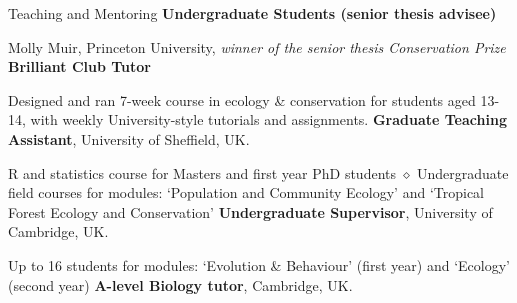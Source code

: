 \begin{rubric}{Teaching and Mentoring}
\entry*[2019 -- 2020] \textbf{Undergraduate Students (senior thesis advisee)}
\par Molly Muir, Princeton University, \emph{winner of the senior thesis Conservation Prize}
\entry*[2017 -- 2018] \textbf{Brilliant Club Tutor}
\par Designed and ran 7-week course in ecology \& conservation for students aged 13-14, with weekly University-style tutorials and assignments.
\entry*[2014 -- 2018] \textbf{Graduate Teaching Assistant}, University of Sheffield, UK.
\par R and statistics course for Masters and first year PhD students $\diamond$ Undergraduate field courses for modules: `Population and Community Ecology' and `Tropical Forest Ecology and Conservation'
%
\entry*[2013 -- 2014] \textbf{Undergraduate Supervisor}, University of Cambridge, UK.
\par Up to 16 students for modules: `Evolution \& Behaviour' (first year) and  `Ecology' (second year)
\entry*[2013 -- 2014] \textbf{A-level Biology tutor}, Cambridge, UK.

\end{rubric}